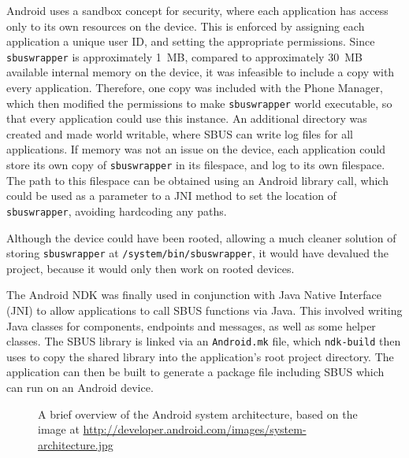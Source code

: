 \documentclass[12pt,twoside,notitlepage]{report}
\begin{document}
Android uses a sandbox concept for security, where each application has access only to its own resources on the device. 
This is enforced by assigning each application a unique user ID, and setting the appropriate permissions. 
Since {\tt sbuswrapper} is approximately \SI{1}{MB}, compared to approximately \SI{30}{MB} available internal memory on the device, it was infeasible to include a copy with every application. 
Therefore, one copy was included with the Phone Manager, which then modified the permissions to make {\tt sbuswrapper} world executable, so that every application could use this instance. 
An additional directory was created and made world writable, where SBUS can write log files for all applications. 
If memory was not an issue on the device, each application could store its own copy of {\tt sbuswrapper} in its filespace, and log to its own filespace. 
The path to this filespace can be obtained using an Android library call, which could be used as a parameter to a JNI method to set the location of {\tt sbuswrapper}, avoiding hardcoding any paths. 

Although the device could have been rooted, allowing a much cleaner solution of storing {\tt sbuswrapper} at {\tt /system/bin/sbuswrapper}, it would have devalued the project, because it would only then work on rooted devices.


The Android NDK was finally used in conjunction with Java Native Interface (JNI) to allow applications to call SBUS functions via Java. 
This involved writing Java classes for components, endpoints and messages, as well as some helper classes. 
The SBUS library is linked via an {\tt Android.mk} file, which {\tt ndk-build} then uses to copy the shared library into the application's root project directory. 
The application can then be built to generate a package file including SBUS which can run on an Android device. 
 
\begin{figure}[h]
\epsfxsize=8cm
\centerline{}
\caption[Android System Architecture]{A brief overview of the Android system architecture, based on the image at \url{http://developer.android.com/images/system-architecture.jpg}}
\label{fig:android_stack}
\end{figure}
\end{document}
